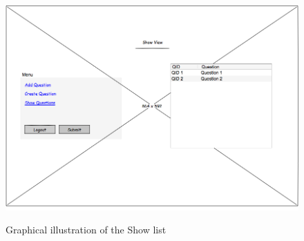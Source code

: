 \begin{figure}[htbp]
\center \includegraphics[width=400pt]{Figures/Shows}\\
\caption{Graphical illustration of the Show list} \label{Figure: Graphical illustration of the Show list}
\end{figure}

